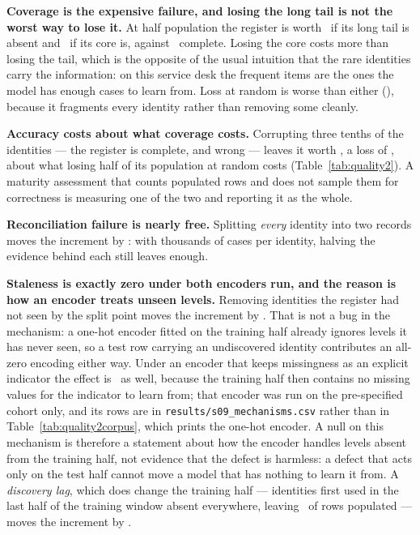 \textbf{Coverage is the expensive failure, and losing the long tail is not the
worst way to lose it.} At half population the register is worth \qRareHalf\ if
its long tail is absent and \qCommonHalf\ if its core is, against \qClean\
complete. Losing the core costs more than losing the tail, which is the
opposite of the usual intuition that the rare identities carry the
information: on this service desk the frequent items are the ones the model has
enough cases to learn from. Loss at random is worse than either
(\qRandomHalf), because it fragments every identity rather than removing some
cleanly.

\textbf{Accuracy costs about what coverage costs.} Corrupting three tenths of
the identities --- the register is complete, and wrong --- leaves it worth
\qCorruptThirty, a loss of \qCorruptThirtyDelta, about what losing half of
its population at random costs (Table~\ref{tab:quality2}). A maturity assessment that counts populated rows and
does not sample them for correctness is measuring one of the two and reporting
it as the whole.

\textbf{Reconciliation failure is nearly free.} Splitting \emph{every}
identity into two records moves the increment by \qDuplicateAllDelta: with
thousands of cases per identity, halving the evidence behind each still leaves
enough.

\textbf{Staleness is exactly zero under both encoders run, and the reason is
how an encoder treats unseen levels.} Removing identities the register had
not seen by the split point moves the increment by \qStaleDelta. That is not
a bug in the mechanism: a one-hot encoder fitted on the training half already
ignores levels it has never seen, so a test row carrying an undiscovered
identity contributes an all-zero encoding either way. Under an encoder that
keeps missingness as an explicit indicator the effect is \qStaleKeepsDelta\
as well, because the training half then contains no missing values for the
indicator to learn from; that encoder was run on the pre-specified cohort only,
and its rows are in \texttt{results/s09\_mechanisms.csv} rather than in
Table~\ref{tab:quality2corpus}, which prints the one-hot encoder. A null on
this mechanism is therefore a statement about how the encoder handles levels
absent from the training half, not evidence that the defect is harmless: a
defect that acts only on the test half cannot move a model that has nothing
to learn it from. A \emph{discovery lag}, which does change the training
half --- identities first used in the last half of the training window absent
everywhere, leaving \qLagHalfPopulated\ of rows populated --- moves the
increment by \qLagHalfDelta.

